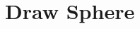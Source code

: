 \documentclass[a4paper]{article}
\begin{document}
\tableofcontents
\thispagestyle{empty}
\clearpage

\setcounter{page}{1}



\newpage
\section{Draw Sphere}




\printbibliography
\end{document}
